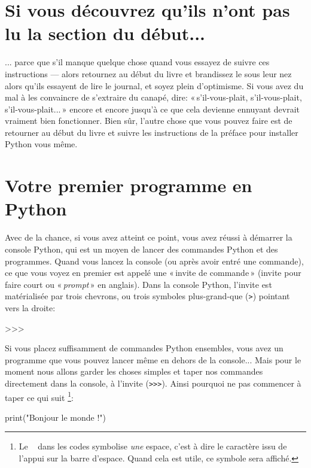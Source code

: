 \section*{Si vous découvrez qu'ils n'ont pas lu la section du début...}

... parce que s'il manque quelque chose quand vous essayez de suivre ces instructions --- alors retournez au début du livre et brandissez le sous leur nez alors qu'ils essayent de lire le journal, et soyez plein d'optimisme. Si vous avez du mal à les convaincre de s'extraire du canapé, dire: « s'il-vous-plait, s'il-vous-plait, s'il-vous-plait... » encore et encore jusqu'à ce que cela devienne ennuyant devrait vraiment bien fonctionner. Bien sûr, l'autre chose que vous pouvez faire est de retourner au début du livre et suivre les instructions de la préface pour installer Python vous même.

\section{Votre premier programme en Python}

Avec de la chance, si vous avez atteint ce point, vous avez réussi à démarrer la console Python, qui est un moyen de lancer des commandes Python et des programmes. Quand vous lancez la console (ou après avoir entré une commande), ce que vous voyez en premier est appelé une « invite de commande » (invite pour faire court ou « \emph{prompt} » en anglais). 
Dans la console Python, l'invite est matérialisée par trois chevrons, ou trois symboles plus-grand-que (\verb+>+) pointant vers la droite:
\begin{Verbatim*}[frame=single,rulecolor=\color{gray}, label=ne pas saisir]
>>>
\end{Verbatim*}
Si vous placez suffisamment de commandes Python ensembles, vous avez un programme que vous pouvez lancer même en dehors de la console... Mais pour le moment nous allons garder les choses simples et taper nos commandes directement dans la console, à l'invite (\verb+>>>+).
\VerbatimFootnotes
Ainsi pourquoi ne pas commencer à taper ce qui suit
\footnote{Le \verb*+ + dans les codes symbolise \emph{une} espace, c'est à dire le caractère issu de l'appui sur la barre d'espace. Quand cela est utile, ce symbole sera affiché.}:

\begin{Verbatim*}[frame=single,rulecolor=\color{mbleu}, label=à taper]
print("Bonjour le monde !")
\end{Verbatim*}

